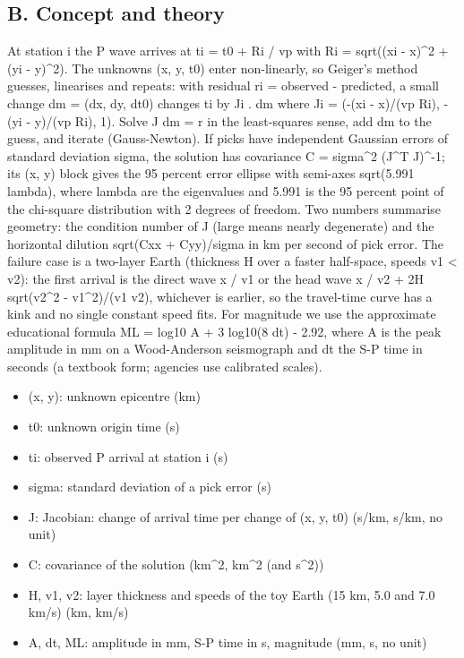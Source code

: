 \documentclass[11pt,a4paper]{article}
\begin{document}
\subsection*{B. Concept and theory}
At station i the P wave arrives at ti = t0 + Ri / vp with Ri = sqrt((xi - x)\textasciicircum{}2 + (yi - y)\textasciicircum{}2). The unknowns (x, y, t0) enter non-linearly, so Geiger's method guesses, linearises and repeats: with residual ri = observed - predicted, a small change dm = (dx, dy, dt0) changes ti by Ji . dm where Ji = (-(xi - x)/(vp Ri), -(yi - y)/(vp Ri), 1). Solve J dm = r in the least-squares sense, add dm to the guess, and iterate (Gauss-Newton). If picks have independent Gaussian errors of standard deviation sigma, the solution has covariance C = sigma\textasciicircum{}2 (J\textasciicircum{}T J)\textasciicircum{}-1; its (x, y) block gives the 95 percent error ellipse with semi-axes sqrt(5.991 lambda), where lambda are the eigenvalues and 5.991 is the 95 percent point of the chi-square distribution with 2 degrees of freedom. Two numbers summarise geometry: the condition number of J (large means nearly degenerate) and the horizontal dilution sqrt(Cxx + Cyy)/sigma in km per second of pick error. The failure case is a two-layer Earth (thickness H over a faster half-space, speeds v1 \textless{} v2): the first arrival is the direct wave x / v1 or the head wave x / v2 + 2H sqrt(v2\textasciicircum{}2 - v1\textasciicircum{}2)/(v1 v2), whichever is earlier, so the travel-time curve has a kink and no single constant speed fits. For magnitude we use the approximate educational formula ML = log10 A + 3 log10(8 dt) - 2.92, where A is the peak amplitude in mm on a Wood-Anderson seismograph and dt the S-P time in seconds (a textbook form; agencies use calibrated scales).

\begin{itemize}[nosep]
\item (x, y): unknown epicentre (km)
\item t0: unknown origin time (s)
\item ti: observed P arrival at station i (s)
\item sigma: standard deviation of a pick error (s)
\item J: Jacobian: change of arrival time per change of (x, y, t0) (s/km, s/km, no unit)
\item C: covariance of the solution (km\textasciicircum{}2, km\textasciicircum{}2 (and s\textasciicircum{}2))
\item H, v1, v2: layer thickness and speeds of the toy Earth (15 km, 5.0 and 7.0 km/s) (km, km/s)
\item A, dt, ML: amplitude in mm, S-P time in s, magnitude (mm, s, no unit)
\end{itemize}
\end{document}
